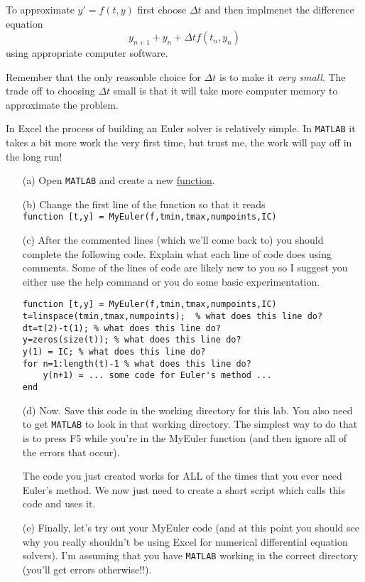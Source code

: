 \begin{technique}
    To approximate $y' = f(t,y)$ first choose $\Delta t$ and then implmenet the difference
    equation
    \[ y_{n+1} + y_n + \Delta t f(t_n,y_n) \]
    using appropriate computer software. 
\end{technique}
Remember that the only reasonble choice for
$\Delta t$ is to make it {\it very small}.  The trade off to choosing $\Delta t$ small
is that it will take more computer memory to approximate the problem.


\begin{problem}
    In Excel the process of building an Euler solver is relatively simple.  In \texttt{MATLAB}
it takes a bit more work the very first time, but trust me, the work will pay off in the
long run!
\begin{enumerate}
    \item[(a)] Open \texttt{MATLAB} and create a new \underline{function}.  
    \item[(b)] Change the first line of the function so that it reads \\
        \texttt{function [t,y] = MyEuler(f,tmin,tmax,numpoints,IC)}
    \item[(c)] After the commented lines (which we'll come back to) you should complete the following
        code.  Explain what each line of code does using comments. Some of the lines of
        code are likely new to you so I suggest you either use the help command or you do
        some basic experimentation.
\begin{verbatim}
function [t,y] = MyEuler(f,tmin,tmax,numpoints,IC)
t=linspace(tmin,tmax,numpoints);  % what does this line do?
dt=t(2)-t(1); % what does this line do?
y=zeros(size(t)); % what does this line do?
y(1) = IC; % what does this line do?
for n=1:length(t)-1 % what does this line do?
    y(n+1) = ... some code for Euler's method ...
end
\end{verbatim}
    \item[(d)] Now.  Save this code in the working directory for this lab.  You also need to
        get \texttt{MATLAB} to look in that working directory.  The simplest way to do
        that is to press F5 while you're in the MyEuler function (and then ignore all of
        the errors that occur).  

        The code you just created works for ALL of the times that you ever need Euler's
        method.  We now just need to create a short script which calls this code and uses
        it.
    \item[(e)] Finally, let's try out your MyEuler code (and at this point you should see why
        you really shouldn't be using Excel for numerical differential equation solvers).
        I'm assuming that you have \texttt{MATLAB} working in the correct directory
        (you'll get errors otherwise!!).  


\end{enumerate}
\end{problem}
